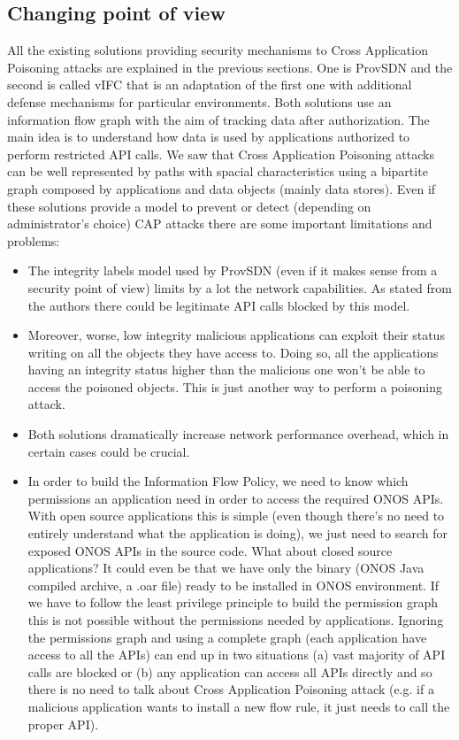 \documentclass[a4paper,10pt]{memoir}
\begin{document}
\subsection{Changing point of view} 

All the existing solutions providing security mechanisms to Cross Application Poisoning attacks are explained in the previous sections. One is ProvSDN and the second is called vIFC that is an adaptation of the first one with additional defense mechanisms for particular environments. Both solutions use an information flow graph with the aim of tracking data after authorization. The main idea is to understand how data is used by applications authorized to perform restricted API calls. We saw that Cross Application Poisoning attacks can be well represented by paths with spacial characteristics using a bipartite graph composed by applications and data objects (mainly data stores). Even if these solutions provide a model to prevent or detect (depending on administrator's choice) CAP attacks there are some important limitations and problems:

\begin{itemize}
    \item The integrity labels model used by ProvSDN (even if it makes sense from a security point of view) limits by a lot the network capabilities. As stated from the authors there could be legitimate API calls blocked by this model. 
    \item Moreover, worse, low integrity malicious applications can exploit their status writing on all the objects they have access to. Doing so, all the applications having an integrity status higher than the malicious one won't be able to access the poisoned objects. This is just another way to perform a poisoning attack.
    \item Both solutions dramatically increase network performance overhead, which in certain cases could be crucial. 
    \item In order to build the Information Flow Policy, we need to know which permissions an application need in order to access the required ONOS APIs. With open source applications this is simple (even though there's no need to entirely understand what the application is doing), we just need to search for exposed ONOS APIs in the source code. What about closed source applications? It could even be that we have only the binary (ONOS Java compiled archive, a .oar file) ready to be installed in ONOS environment. If we have to follow the least privilege principle to build the permission graph this is not possible without the permissions needed by applications. Ignoring the permissions graph and using a complete graph (each application have access to all the APIs) can end up in two situations (a) vast majority of API calls are blocked or (b) any application can access all APIs directly and so there is no need to talk about Cross Application Poisoning attack (e.g. if a malicious application wants to install a new flow rule, it just needs to call the proper API).
\end{itemize}
\end{document}
